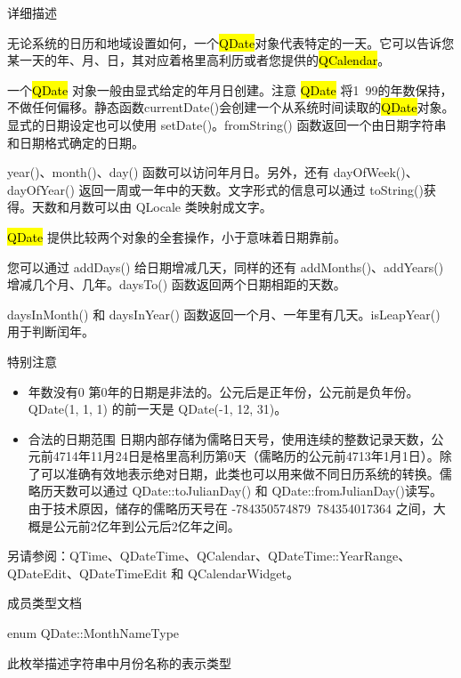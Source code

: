 详细描述

无论系统的日历和地域设置如何，一个\hl{QDate}对象代表特定的一天。它可以告诉您某一天的年、月、日，其对应着格里高利历或者您提供的\hl{QCalendar}。

一个\hl{QDate} 对象一般由显式给定的年月日创建。注意 \hl{QDate} 将1~99的年数保持，不做任何偏移。静态函数currentDate()会创建一个从系统时间读取的\hl{QDate}对象。显式的日期设定也可以使用 setDate()。fromString() 函数返回一个由日期字符串和日期格式确定的日期。

year()、month()、day() 函数可以访问年月日。另外，还有 dayOfWeek()、dayOfYear() 返回一周或一年中的天数。文字形式的信息可以通过 toString()获得。天数和月数可以由 QLocale 类映射成文字。

\hl{QDate} 提供比较两个对象的全套操作，小于意味着日期靠前。

您可以通过 addDays() 给日期增减几天，同样的还有 addMonths()、addYears() 增减几个月、几年。daysTo() 函数返回两个日期相距的天数。

daysInMonth() 和 daysInYear() 函数返回一个月、一年里有几天。isLeapYear() 用于判断闰年。

特别注意

\begin{itemize}
\item 年数没有0 第0年的日期是非法的。公元后是正年份，公元前是负年份。QDate(1, 1, 1) 的前一天是 QDate(-1, 12, 31)。
\item 合法的日期范围 日期内部存储为儒略日天号，使用连续的整数记录天数，公元前4714年11月24日是格里高利历第0天（儒略历的公元前4713年1月1日）。除了可以准确有效地表示绝对日期，此类也可以用来做不同日历系统的转换。儒略历天数可以通过 QDate::toJulianDay() 和 QDate::fromJulianDay()读写。 由于技术原因，储存的儒略历天号在 -784350574879~784354017364 之间，大概是公元前2亿年到公元后2亿年之间。
\end{itemize}

另请参阅：QTime、QDateTime、QCalendar、QDateTime::YearRange、QDateEdit、QDateTimeEdit 和 QCalendarWidget。

\splitLine

成员类型文档

enum QDate::MonthNameType

此枚举描述字符串中月份名称的表示类型

